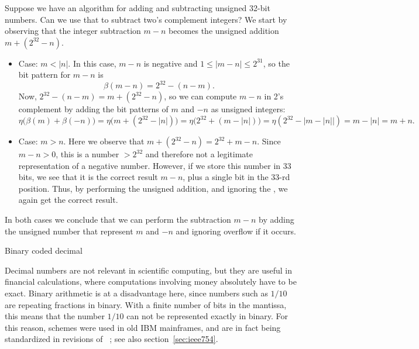 Suppose we have an algorithm for adding and subtracting unsigned
32-bit numbers. Can we use that to subtract two's complement integers?
We start by observing that the integer subtraction $m-n$ becomes the
unsigned addition $m+(2^{32}-n)$.
\begin{itemize}
\item Case: $m<|n|$. In this case, $m-n$ is negative and
  $1\leq |m-n|\leq 2^{31}$, so the bit pattern for $m-n$ is
  \begin{equation}
    \beta(m-n) = 2^{32}-(n-m).
  \end{equation}
  Now, $2^{32}-(n-m)=m+(2^{32}-n)$, so we can compute
  $m-n$ in 2's complement by adding the bit patterns of $m$ and $-n$ as
  unsigned integers:
  \begin{equation}
    \eta\bigl( \beta(m)+\beta(-n) \bigr) =
  \eta\bigl( m+(2^{32}-|n|) \bigr) =
  \eta\bigl( 2^{32} + (m-|n|) \bigr) = 
  \eta\left( 2^{32} - \bigl|m-|n|\bigr| \right) = m-|n| = m+n
  .
  \end{equation}
\item Case: $m>n$. Here we observe that
  $m+(2^{32}-n)=2^{32}+m-n$. Since $m-n>0$, this is a number $>2^{32}$
  and therefore not a legitimate
  representation of a negative number. However, if we store this
  number in 33 bits, we see that it is
  the correct result $m-n$, plus a single bit in the
  33-rd position. Thus, by performing the unsigned addition, and
  ignoring the , we again get the correct result.
\end{itemize}
In both cases we conclude that we can perform the subtraction $m-n$ by adding
the unsigned number that represent $m$ and $-n$
and ignoring overflow if it occurs.

 {Binary coded decimal}
\label{sec:bcd}

Decimal numbers are not relevant in scientific computing, but they are
useful in financial calculations, where computations involving money
absolutely have to be exact. Binary arithmetic is at a disadvantage
here, since numbers such as $1/10$ are repeating fractions in
binary. With a finite number of bits in the mantissa,
this means that the number $1/10$ can not be represented exactly in
binary.  For this reason,  schemes
were used in old IBM mainframes, and are in fact being
standardized in revisions of ~\cite{754-2019,ieee754-webpage}; see also
section~\ref{sec:ieee754}.

